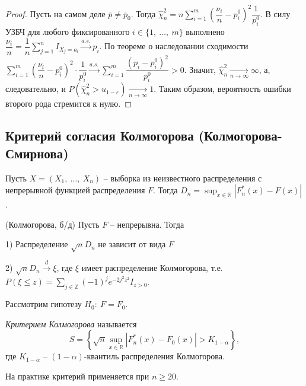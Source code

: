 \begin{proof}
    Пусть на самом деле $\displaystyle \overline{p} \neq \overline{p}_{0}$. Тогда $\displaystyle \hat{\chi }_{n}^{2} =n\sum _{i=1}^{m}\left(\dfrac{\nu _{i}}{n} -p_{i}^{0}\right)^{2}\dfrac{1}{p_{i}^{0}}$. В силу УЗБЧ для любого фиксированного $\displaystyle i\in \{1,\ \dotsc ,\ m\}$ выполнено $\displaystyle \dfrac{\nu _{i}}{n} =\dfrac{1}{n}\sum _{j=1}^{n} I_{X_{j} =a_{i}}\xrightarrow{a.s.} p_{i}$. По теореме о наследовании сходимости $\displaystyle \sum _{i=1}^{m}\left(\dfrac{\nu _{i}}{n} -p_{i}^{0}\right)^{2} \cdotp \dfrac{1}{p_{i}^{0}}\xrightarrow{a.s.}\sum _{i=1}^{m}\dfrac{\left( p_{i} -p_{i}^{0}\right)^{2}}{p_{i}^{0}}  >0$. Значит, $\displaystyle \hat{\chi }_{n}^{2}\xrightarrow[n\rightarrow \infty ]{} \infty $, а, следовательно, и $\displaystyle P\left(\hat{\chi }_{n}^{2}  >u_{1-\varepsilon }\right)\xrightarrow[n\rightarrow \infty ]{} 1$. Таким образом, вероятность ошибки второго рода стремится к нулю.
\end{proof}
\subsection{Критерий согласия Колмогорова (Колмогорова-Смирнова)}

Пусть $\displaystyle X=( X_{1} ,\ \dotsc ,\ X_{n})$ -- выборка из неизвестного распределения с непрерывной функцией распределения $\displaystyle F$. Тогда $\displaystyle D_{n} =\sup _{x\in \mathbb{R}}\left| F_{n}^{*}( x) -F( x)\right| $.
\begin{theorem}
    (Колмогорова, б/д) Пусть $\displaystyle F$ -- непрерывна. Тогда
    
    1) Распределение $\displaystyle \sqrt{n} D_{n}$ не зависит от вида $\displaystyle F$
    
    2) $\displaystyle \sqrt{n} D_{n}\xrightarrow{d} \xi $, где $\displaystyle \xi $ имеет распределение Колмогорова, т.е. $\displaystyle P( \xi \leqslant z) =\sum _{j\in \mathbb{Z}}( -1)^{j} e^{-2j^{2} z^{2}} I_{z >0}$.
\end{theorem}
Рассмотрим гипотезу $\displaystyle H_{0} :\ F=F_{0}$.
\begin{definition}
    \textit{Критерием Колмогорова} называется
    \begin{equation*}
        S=\left\{\sqrt{n}\sup _{x\in \mathbb{R}}\left| F_{n}^{*}( x) -F_{0}( x)\right|  >K_{1-\alpha }\right\} ,
    \end{equation*}
    где $\displaystyle K_{1-\alpha }$ -- $\displaystyle ( 1-\alpha )$-квантиль распределения Колмогорова.
\end{definition}
\begin{note}
    На практике критерий применяется при $\displaystyle n\geqslant 20$.
\end{note}
